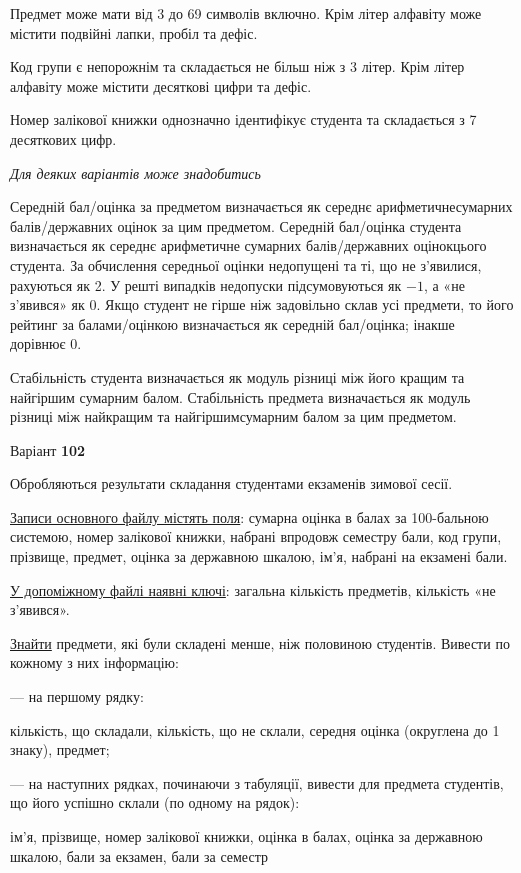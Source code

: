 \documentclass[11pt, ukrainian]{article}
\begin{document}
Предмет може мати від 3 до 69 символів включно. 
Крім літер алфавіту може містити подвійні лапки, пробіл та дефіс.

Код групи є непорожнім та складається не більш ніж з 3 літер. 
Крім літер алфавіту може містити десяткові цифри та дефіс.


Номер залікової книжки однозначно ідентифікує студента та складається з 7 десяткових цифр. 

\bigskip\textit{Для деяких варіантів може знадобитись}

Середній бал/оцінка за предметом визначається як середнє арифметичнесумарних балів/державних оцінок за цим предметом. 
Середній бал/оцінка студента визначається як середнє арифметичне сумарних балів/державних оцінокцього студента. 
За обчислення середньої оцінки недопущені та ті, що не з’явилися, рахуються як 2.
У решті випадків недопуски підсумовуються як $-1$, а «не з’явився» як 0.
Якщо студент не гірше ніж задовільно склав усі предмети, 
то його рейтинг за балами/оцінкою визначається як середній бал/оцінка; інакше дорівнює 0.

Стабільність студента визначається як модуль різниці між його кращим та найгіршим сумарним балом.
Стабільність предмета визначається як модуль різниці між найкращим та найгіршимсумарним балом за цим предметом.






\par
\newpage
{\center Варіант  \No \textbf { 102 }\par}
\bigskip
Обробляються результати складання студентами екзаменів зимової сесії.

\underline{Записи основного файлу містять поля}: сумарна оцінка в балах за 100-бальною системою, номер залікової книжки, набрані впродовж семестру бали, код групи, прізвище, предмет, оцінка за державною шкалою, ім’я, набрані на екзамені бали.

\underline{У допоміжному файлі наявні ключі}: загальна кількість предметів, кількість «не з’явився».

\underline{Знайти} предмети, які були складені менше, ніж половиною студентів. Вивести по кожному з них інформацію:\par
{\noindent}--- на першому рядку:\par
кількість, що складали, кількість, що не склали, середня оцінка (округлена до 1 знаку), предмет;

{\noindent}--- на наступних рядках, починаючи з табуляції, вивести для предмета студентів, що його успішно склали (по одному на рядок):\par
ім’я, прізвище, номер залікової книжки, оцінка в балах, оцінка за державною шкалою, бали за екзамен, бали за семестр
\end{document}
